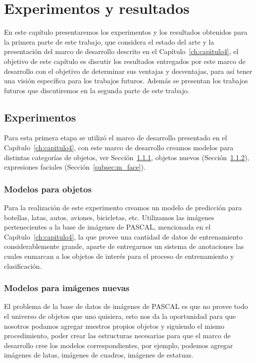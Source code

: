 \chapter[Experimentos y resultados]{Experimentos y resultados}\label{ch:capitulo6}
En este capítulo presentaremos los experimentos y los resultados obtenidos para la primera parte de este trabajo, que considera el estado del arte y la presentación del marco de desarrollo descrito en el Capítulo~\ref{ch:capitulo4}, el objetivo de este capítulo es discutir los resultados entregados por este marco de desarrollo con el objetivo de determinar sus ventajas y desventajas, para así tener una visión específica para los trabajos futuros. Además se presentan los trabajos futuros que discutiremos en la segunda parte de este trabajo.

\section{Experimentos}
Para esta primera etapa se utilizó el marco de desarrollo presentado en el Capítulo~\ref{ch:capitulo4}, con este marco de desarrollo creamos modelos para distintas categorías de objetos, ver Sección~\ref{subsec:m_obj}, objetos nuevos (Sección~\ref{subsec:m_new_im}), expresiones faciales (Sección~\ref{subsec:m_face}).

\subsection{Modelos para objetos}\label{subsec:m_obj}
Para la realización de este experimento creamos un modelo de predicción para botellas, latas, autos, aviones, bicicletas, etc. Utilizamos las imágenes pertenecientes a la base de imágenes de PASCAL, mencionada en el Capítulo~\ref{ch:capitulo4}, la que provee una cantidad de datos de entrenamiento considerablemente grande, aparte de entregarnos un sistema de anotaciones las cuales enmarcan a los objetos de interés para el proceso de entrenamiento y clasificación.

\subsection{Modelos para imágenes nuevas}\label{subsec:m_new_im}
El problema de la base de datos de imágenes de PASCAL es que no provee todo el universo de objetos que uno quisiera, esto nos da la oportunidad para que nosotros podamos agregar nuestros propios objetos y siguiendo el mismo procedimiento, poder crear las estructuras necesarias para que el marco de desarrollo cree los modelos correspondientes, por ejemplo, podemos agregar imágenes de latas, imágenes de cuadros, imágenes de estatuas.

